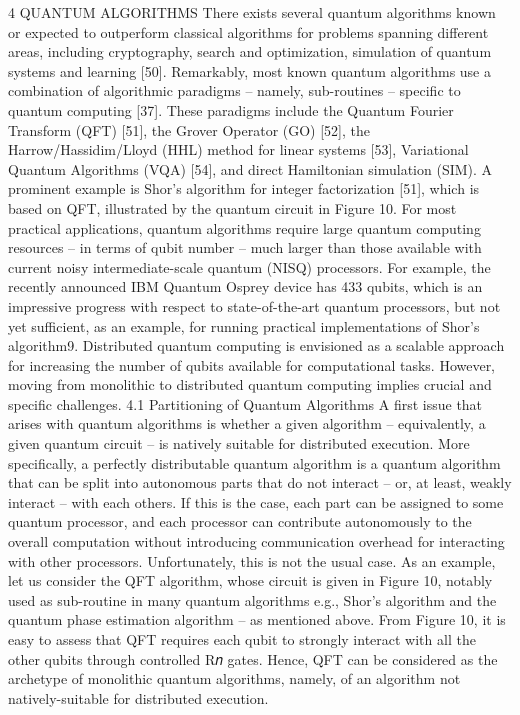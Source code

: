 4 QUANTUM ALGORITHMS There exists several quantum algorithms known or expected to outperform classical algorithms for problems spanning different areas, including cryptography, search and optimization, simulation of quantum systems and learning [50]. Remarkably, most known quantum algorithms use a combination of algorithmic paradigms – namely, sub-routines – specific to quantum computing [37]. These paradigms include the Quantum Fourier Transform (QFT) [51], the Grover Operator (GO) [52], the Harrow/Hassidim/Lloyd (HHL) method for linear systems [53], Variational Quantum Algorithms (VQA) [54], and direct Hamiltonian simulation (SIM). A prominent example is Shor’s algorithm for integer factorization [51], which is based on QFT, illustrated by the quantum circuit in Figure 10. For most practical applications, quantum algorithms require large quantum computing resources – in terms of qubit number – much larger than those available with current noisy intermediate-scale quantum (NISQ) processors. For example, the recently announced IBM Quantum Osprey device has 433 qubits, which is an impressive progress with respect to state-of-the-art quantum processors, but not yet sufficient, as an example, for running practical implementations of Shor’s algorithm9. Distributed quantum computing is envisioned as a scalable approach for increasing the number of qubits available for computational tasks. However, moving from monolithic to distributed quantum computing implies crucial and specific challenges. 4.1 Partitioning of Quantum Algorithms A first issue that arises with quantum algorithms is whether a given algorithm – equivalently, a given quantum circuit – is natively suitable for distributed execution. More specifically, a perfectly distributable quantum algorithm is a quantum algorithm that can be split into autonomous parts that do not interact – or, at least, weakly interact – with each others. If this is the case, each part can be assigned to some quantum processor, and each processor can contribute autonomously to the overall computation without introducing communication overhead for interacting with other processors. Unfortunately, this is not the usual case. As an example, let us consider the QFT algorithm, whose circuit is given in Figure 10, notably used as sub-routine in many quantum algorithms e.g., Shor’s algorithm and the quantum phase estimation algorithm – as mentioned above. From Figure 10, it is easy to assess that QFT requires each qubit to strongly interact with all the other qubits through controlled R𝑛 gates. Hence, QFT can be considered as the archetype of monolithic quantum algorithms, namely, of an algorithm not natively-suitable for distributed execution.

